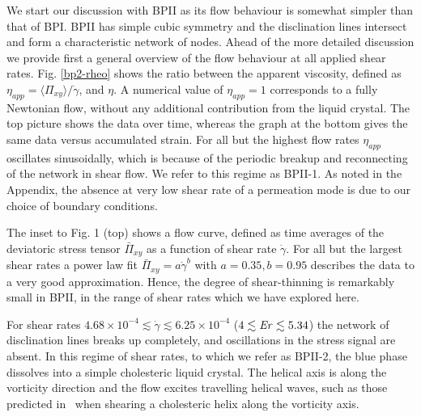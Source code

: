 \documentclass[aps,pre,reprint,superscriptaddress, twocolumn]{revtex4}
\newcommand{\e}[1]{\times10^{#1}}
\newcommand{\gd}{\dot{\gamma}}
\begin{document}
We start our discussion with BPII as its flow behaviour is somewhat simpler 
than that of BPI. BPII has simple cubic symmetry and the disclination lines 
intersect and form a characteristic network of nodes.
Ahead of the more detailed discussion we provide first a general overview of the 
flow behaviour at all applied shear rates.
Fig. \ref{bp2-rheo} shows the ratio between the apparent viscosity, 
defined as 
$\eta_{app}=\langle \Pi_{xy} \rangle/\gd$, and $\eta$.
A numerical value of $\eta_{app}=1$ corresponds to a fully Newtonian flow,
without any additional contribution from the liquid crystal.
The top picture shows the data over time, whereas the graph at the bottom gives 
the same data versus accumulated strain.
For all but the highest flow rates $\eta_{app}$ oscillates sinusoidally, which
is because of the periodic breakup and reconnecting of the network in shear flow. 
We refer to this regime as BPII-1. As noted in the Appendix, the
absence at very low shear rate of a permeation mode is due to our
choice of boundary conditions.

The inset to Fig. 1 (top) shows a flow curve, defined as time averages of 
the deviatoric stress tensor $\bar{\Pi}_{xy}$ as a function of shear rate $\gd$.
For all but the largest shear rates a power law fit $\bar{\Pi}_{xy}=a \gd^b$ with 
$a=0.35, b=0.95$ describes the data to a very good approximation. 
Hence, the degree of shear-thinning is remarkably small in BPII, in
the range of shear rates which we have explored here.

For shear rates $4.68\e{-4}\lesssim\gd\lesssim6.25\e{-4}$ ($4\lesssim {\it Er} \lesssim 5.34$) the network of disclination lines
breaks up completely, and oscillations in the stress signal are absent.
In this regime of shear rates, to which we refer as BPII-2, the 
blue phase dissolves into a simple cholesteric liquid 
crystal. The helical axis is along the vorticity direction and
the flow excites travelling helical waves, such as those 
predicted in~\cite{Rey:1996a,Rey:1996b} when shearing a cholesteric helix along
the vorticity axis.
\end{document}
